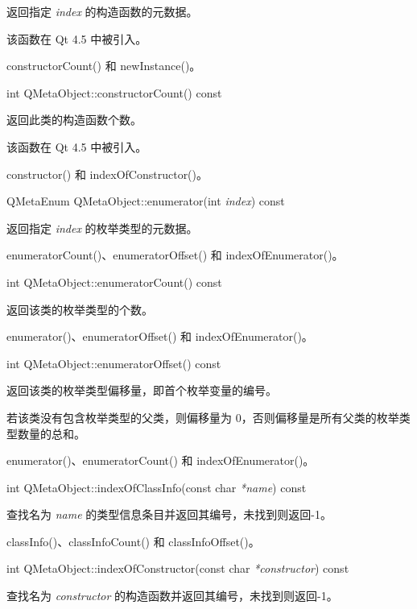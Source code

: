 返回指定 \emph{index} 的构造函数的元数据。

该函数在 Qt 4.5 中被引入。

\begin{notice}[另请参阅]
constructorCount() 和 newInstance()。
\end{notice}

int QMetaObject::constructorCount() const

返回此类的构造函数个数。

该函数在 Qt 4.5 中被引入。

\begin{notice}[另请参阅]
constructor() 和 indexOfConstructor()。
\end{notice}

QMetaEnum QMetaObject::enumerator(int \emph{index}) const

返回指定 \emph{index} 的枚举类型的元数据。

\begin{notice}[另请参阅]
enumeratorCount()、enumeratorOffset() 和 indexOfEnumerator()。
\end{notice}

int QMetaObject::enumeratorCount() const

返回该类的枚举类型的个数。

\begin{notice}[另请参阅]
enumerator()、enumeratorOffset() 和 indexOfEnumerator()。
\end{notice}
	
int QMetaObject::enumeratorOffset() const

返回该类的枚举类型偏移量，即首个枚举变量的编号。

若该类没有包含枚举类型的父类，则偏移量为 0，否则偏移量是所有父类的枚举类型数量的总和。

\begin{notice}[另请参阅]
enumerator()、enumeratorCount() 和 indexOfEnumerator()。
\end{notice}

int QMetaObject::indexOfClassInfo(const char \emph{*name}) const

查找名为 \emph{name} 的类型信息条目并返回其编号，未找到则返回-1。

\begin{notice}[另请参阅]
classInfo()、classInfoCount() 和 classInfoOffset()。
\end{notice}

int QMetaObject::indexOfConstructor(const char \emph{*constructor}) const

查找名为 \emph{constructor} 的构造函数并返回其编号，未找到则返回-1。

